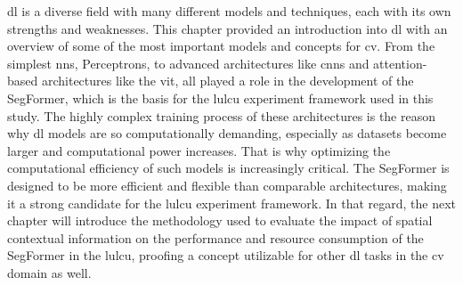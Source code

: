 \gls{dl} is a diverse field with many different models and techniques, each with its own strengths and weaknesses. This chapter provided an introduction into \gls{dl} with an overview of some of the most important models and concepts for \gls{cv}. From the simplest \glspl{nn}, Perceptrons, to advanced architectures like \glspl{cnn} and attention-based architectures like the \gls{vit}, all played a role in the development of the SegFormer, which is the basis for the \gls{lulcu} experiment framework used in this study. The highly complex training process of these architectures is the reason why \gls{dl} models are so computationally demanding, especially as datasets become larger and computational power increases. That is why optimizing the computational efficiency of such models is increasingly critical. The SegFormer is designed to be more efficient and flexible than comparable architectures, making it a strong candidate for the \gls{lulcu} experiment framework. In that regard, the next chapter will introduce the methodology used to evaluate the impact of spatial contextual information on the performance and resource consumption of the SegFormer in the \gls{lulcu}, proofing a concept utilizable for other \gls{dl} tasks in the \gls{cv} domain as well.
